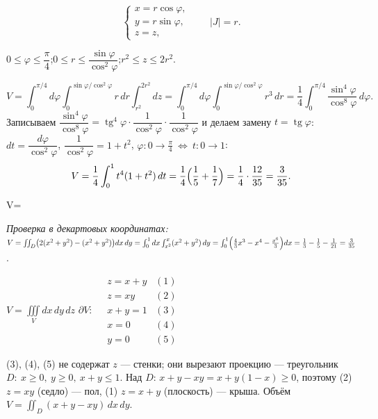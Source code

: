 \[
\begin{cases}x=r\cos\varphi,\\ y=r\sin\varphi,\\ z=z,\end{cases}\qquad |J|=r .
\]

$0\leqslant\varphi\leqslant\dfrac\pi4$;\quad $0\leqslant r\leqslant\dfrac{\sin\varphi}{\cos^2\varphi}$;\quad $r^2\leqslant z\leqslant2r^2$.

\[
V=\int_0^{\pi/4}d\varphi\int_0^{\sin\varphi/\cos^2\varphi}r\,dr\int_{r^2}^{2r^2}dz
=\int_0^{\pi/4}d\varphi\int_0^{\sin\varphi/\cos^2\varphi}r^3\,dr
=\frac14\int_0^{\pi/4}\frac{\sin^4\varphi}{\cos^8\varphi}\,d\varphi .
\]
Записываем $\dfrac{\sin^4\varphi}{\cos^8\varphi}=\operatorname{tg}^4\varphi\cdot\dfrac1{\cos^2\varphi}\cdot\dfrac{1}{\cos^2\varphi}$ и делаем замену $t=\operatorname{tg}\varphi$: $dt=\dfrac{d\varphi}{\cos^2\varphi}$, $\dfrac1{\cos^2\varphi}=1+t^2$, $\varphi:0\to\frac\pi4\ \Leftrightarrow\ t:0\to1$:
\[
V=\frac14\int_0^1t^4(1+t^2)\,dt=\frac14\Bigl(\frac15+\frac17\Bigr)=\frac14\cdot\frac{12}{35}=\frac{3}{35}.
\]

\begin{answerbox}
V=
\end{answerbox}

\emph{Проверка в декартовых координатах:} $V=\iint_D\bigl(2(x^2+y^2)-(x^2+y^2)\bigr)dx\,dy=\int_0^1dx\int_{x^2}^x(x^2+y^2)\,dy=\int_0^1\Bigl(\frac43x^3-x^4-\frac{x^6}{3}\Bigr)dx=\frac13-\frac15-\frac1{21}=\frac{3}{35}$. \checkmark


\begin{shapka}
$\displaystyle V=\iiint\limits_{V}dx\,dy\,dz$
\tcblower
$\partial V:\quad
\begin{array}{ll}
z=x+y & (1)\\
z=xy & (2)\\
x+y=1 & (3)\\
x=0 & (4)\\
y=0 & (5)
\end{array}$
\end{shapka}

(3), (4), (5) не содержат $z$ --- стенки; они вырезают проекцию --- треугольник $D:\ x\geqslant0,\ y\geqslant0,\ x+y\leqslant1$. Над $D$: $x+y-xy=x+y(1-x)\geqslant0$, поэтому (2) $z=xy$ (седло) --- пол, (1) $z=x+y$ (плоскость) --- крыша. Объём $V=\iint_D(x+y-xy)\,dx\,dy$.

